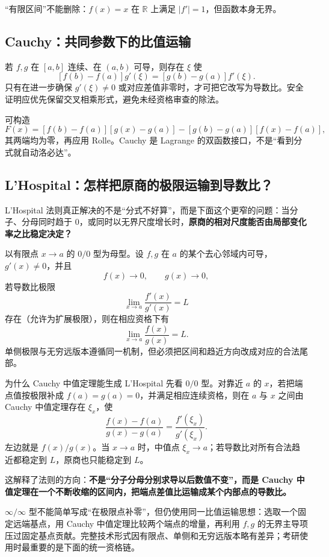 \documentclass[UTF8,fontset=none,11pt,a4paper]{ctexart}
\begin{document}
“有限区间”不能删除：$f(x)=x$ 在 $\mathbb R$ 上满足 $\lvert f'\rvert=1$，但函数本身无界。

\subsection{Cauchy：共同参数下的比值运输}

若 $f,g$ 在 $[a,b]$ 连续、在 $(a,b)$ 可导，则存在 $\xi$ 使
\[
[f(b)-f(a)]g'(\xi)=[g(b)-g(a)]f'(\xi).
\]
只有在进一步确保 $g'(\xi)\ne0$ 或对应差值非零时，才可把它改写为导数比。安全证明应优先保留交叉相乘形式，避免未经资格审查的除法。

可构造
\[
F(x)=[f(b)-f(a)][g(x)-g(a)]-[g(b)-g(a)][f(x)-f(a)],
\]
其两端均为零，再应用 Rolle。Cauchy 是 Lagrange 的双函数接口，不是“看到分式就自动洛必达”。

\subsection{L'Hospital：怎样把原商的极限运输到导数比？}

L'Hospital 法则真正解决的不是“分式不好算”，而是下面这个更窄的问题：当分子、分母同时趋于 $0$，或同时以无界尺度增长时，\textbf{原商的相对尺度能否由局部变化率之比稳定决定？}

以有限点 $x\to a$ 的 $0/0$ 型为母型。设 $f,g$ 在 $a$ 的某个去心邻域内可导，$g'(x)\ne0$，并且
\[
 f(x)\to0,\qquad g(x)\to0,
\]
若导数比极限
\[
\lim_{x\to a}\frac{f'(x)}{g'(x)}=L
\]
存在（允许为扩展极限），则在相应资格下有
\[
\boxed{\lim_{x\to a}\frac{f(x)}{g(x)}=L.}
\]
单侧极限与无穷远版本遵循同一机制，但必须把区间和趋近方向改成对应的合法尾部。

\begin{corebox}{为什么 Cauchy 中值定理能生成 L'Hospital}
先看 $0/0$ 型。对靠近 $a$ 的 $x$，若把端点值按极限补成 $f(a)=g(a)=0$，并满足相应连续资格，则在 $a$ 与 $x$ 之间由 Cauchy 中值定理存在 $\xi_x$，使
\[
\frac{f(x)-f(a)}{g(x)-g(a)}
=
\frac{f'(\xi_x)}{g'(\xi_x)}.
\]
左边就是 $f(x)/g(x)$。当 $x\to a$ 时，中值点 $\xi_x\to a$；若导数比对所有合法趋近都稳定到 $L$，原商也只能稳定到 $L$。

这解释了法则的方向：\textbf{不是“分子分母分别求导以后数值不变”，而是 Cauchy 中值定理在一个不断收缩的区间内，把端点差值比运输成某个内部点的导数比。}
\end{corebox}

$\infty/\infty$ 型不能简单写成“在极限点补零”，但仍使用同一比值运输思想：选取一个固定远端基点，用 Cauchy 中值定理比较两个端点的增量，再利用 $f,g$ 的无界主导项压过固定基点贡献。完整技术形式因有限点、单侧和无穷远版本略有差异；考研使用时最重要的是下面的统一资格链。
\end{document}
